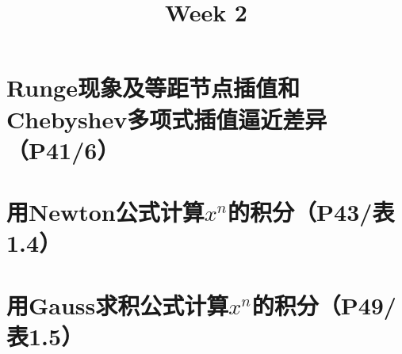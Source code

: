 \documentclass{homework}
\title{Week 2}
\begin{document}
\maketitle
\section{Runge现象及等距节点插值和Chebyshev多项式插值逼近差异（P41/6）}

\section{用Newton公式计算$x^n$的积分（P43/表1.4）}

\section{用Gauss求积公式计算$x^n$的积分（P49/表1.5）}
\end{document}
